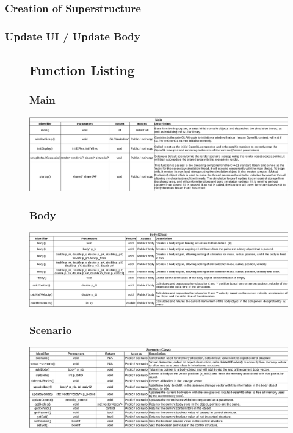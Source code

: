\subsubsection{Creation of Superstructure}

\subsubsection{Update UI / Update Body}

\begin{figure}
\subsection{Function Listing}
  \subsubsection{Main}
  \centering  
  \includegraphics[width=\textwidth]{img/functions/main.png}
\end{figure}

\begin{figure}
  \subsubsection{Body}
  \centering  
  \includegraphics[width=\textwidth]{img/functions/body.png}
\end{figure}

\begin{figure}
  \subsubsection{Scenario}
  \centering  
  \includegraphics[width=\textwidth]{img/functions/scenario.png}
\end{figure}

